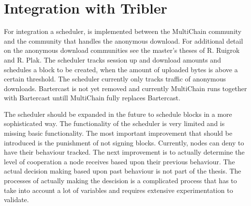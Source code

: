 \section{Integration with Tribler}
For integration a scheduler, is implemented between the MultiChain community
and the community that handles the anonymous download.
For additional detail on the anonymous download communities
see the master's theses of R. Ruigrok\cite{ruigrok-anonymous} and R. Plak\cite{Plak-anonymous}.
The scheduler tracks session up and download amounts and schedules a block to be created,
when the amount of uploaded bytes is above a certain threshold.
The scheduler currently only tracks traffic of anonymous downloads.
Bartercast is not yet removed and
currently MultiChain runs together with Bartercast untill MultiChain fully replaces Bartercast.

The scheduler should be expanded in the future to schedule blocks in a more sophisticated way.
The functionality of the scheduler is very limited and is missing basic functionality.
The most important improvement that should be introduced is the punishment of not signing blocks.
Currently, nodes can deny to have their behaviour tracked.
The next improvement is to actually determine the level of cooperation a node receives based upon their previous behaviour.
The actual decision making based upon past behaviour is not part of the thesis.
The processes of actually making the descision is a complicated process that has to take into account a lot of variables
and requires extensive experimentation to validate.